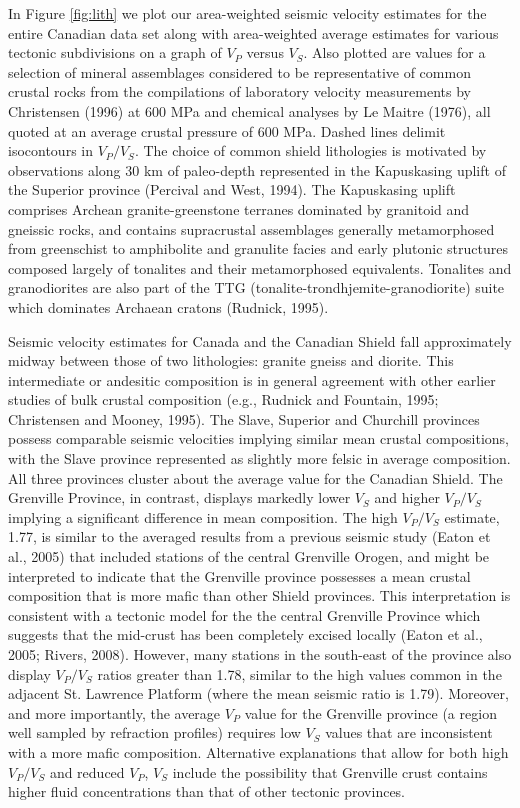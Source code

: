 \documentclass[msc,oneside]{ubcthesis}
\begin{document}
In Figure \ref{fig:lith} we plot our area-weighted seismic velocity estimates for the entire Canadian data set along with area-weighted average estimates for various tectonic subdivisions on a graph of $V_P$ versus $V_S$. Also plotted are values for a selection of mineral assemblages considered to be representative of common crustal rocks from the compilations of laboratory velocity measurements by Christensen (1996) at 600 MPa and chemical analyses by Le Maitre (1976), all quoted at an average crustal pressure of 600 MPa. Dashed lines delimit isocontours in $V_P/V_S$. The choice of common shield lithologies is motivated by observations along 30 km of paleo-depth represented in the Kapuskasing uplift of the Superior province (Percival and West, 1994). The Kapuskasing uplift comprises Archean granite-greenstone terranes dominated by granitoid and gneissic rocks, and contains supracrustal assemblages generally metamorphosed from greenschist to amphibolite and granulite facies and early plutonic structures composed largely of tonalites and their metamorphosed equivalents. Tonalites and granodiorites are also part of the TTG (tonalite-trondhjemite-granodiorite) suite which dominates Archaean cratons (Rudnick, 1995).

Seismic velocity estimates for Canada and the Canadian Shield fall approximately midway between those of two lithologies: granite gneiss and diorite. This intermediate or andesitic composition is in general agreement with other earlier studies of bulk crustal composition (e.g., Rudnick and Fountain, 1995; Christensen and Mooney, 1995). The Slave, Superior and Churchill provinces possess comparable seismic velocities implying similar mean crustal compositions, with the Slave province represented as slightly more felsic in average composition. All three provinces cluster about the average value for the Canadian Shield. The Grenville Province, in contrast, displays markedly lower $V_S$ and higher $V_P/V_S$ implying a significant difference in mean composition. The high $V_P/V_S$ estimate, 1.77, is similar to the averaged results from a previous seismic study (Eaton et al., 2005) that included stations of the central Grenville Orogen, and might be interpreted to indicate that the Grenville province possesses a mean crustal composition that is more mafic than other Shield provinces. This interpretation is consistent with a tectonic model for the the central Grenville Province which suggests that the mid-crust has been completely excised locally (Eaton et al., 2005; Rivers, 2008). However, many stations in the south-east of the province also display $V_P/V_S$ ratios greater than 1.78, similar to the high values common in the adjacent St. Lawrence Platform (where the mean seismic ratio is 1.79). Moreover, and more importantly, the average $V_P$ value for the Grenville province (a region well sampled by refraction profiles) requires low $V_S$ values that are inconsistent with a more mafic composition. Alternative explanations that allow for both high $V_P/V_S$ and reduced $V_P$, $V_S$ include the possibility that Grenville crust contains higher fluid concentrations than that of other tectonic provinces.
\end{document}
